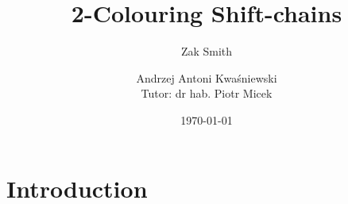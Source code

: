 \documentclass[aspectratio=169]{beamer}
\title[2-colouring shift-chains]{2-Colouring Shift-chains}
\subtitle{Zak Smith}
\author[Andrzej Antoni Kwaśniewski]{Andrzej Antoni Kwaśniewski\\Tutor: dr hab. Piotr Micek}
\date{\today}
\begin{document}
\onehalfspacing

\frame{\titlepage}

\section{Introduction}





% 
\end{document}
